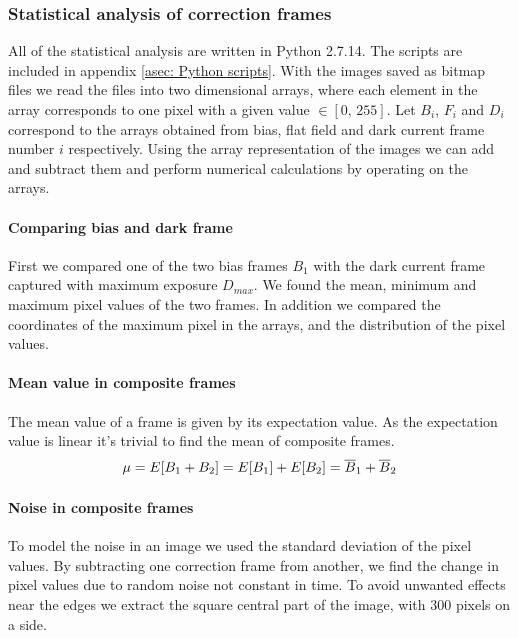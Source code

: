 \documentclass{emulateapj}
\begin{document}
\subsubsection{Statistical analysis of correction frames}
\label{subsubsec: Method/ Statistical on correction frames}
All of the statistical analysis are written in Python 2.7.14. The scripts are included in appendix \ref{asec: Python scripts}. With the images saved as bitmap files we read the files into two dimensional arrays, where each element in the array corresponds to one pixel with a given value $\in [0,\,255]$. Let $B_i$, $F_i$ and $D_i$ correspond to the arrays obtained from bias, flat field and dark current frame number $i$ respectively. Using the array representation of the images we can add and subtract them and perform numerical calculations by operating on the arrays.

\paragraph{Comparing bias and dark frame} 
First we compared one of the two bias frames $B_1$ with the dark current frame captured with maximum exposure $D_{max}$. We found the mean, minimum and maximum pixel values of the two frames. In addition we compared the coordinates of the maximum pixel in the arrays, and the distribution of the pixel values.

\paragraph{Mean value in composite frames}
The mean value of a frame is given by its expectation value. As the expectation value is linear it's trivial to find the mean of composite frames.
\begin{equation}
	\mu = E\qty[B_1 + B_2] = E\qty[B_1] + E\qty[B_2] = \overline{B}_1 + \overline{B}_2
	\label{eq: Composite mean}
\end{equation}

\paragraph{Noise in composite frames}
To model the noise in an image we used the standard deviation of the pixel values. By subtracting one correction frame from another, we find the change in pixel values due to random noise not constant in time. To avoid unwanted effects near the edges we extract the square central part of the image, with $300$ pixels on a side.
\end{document}

